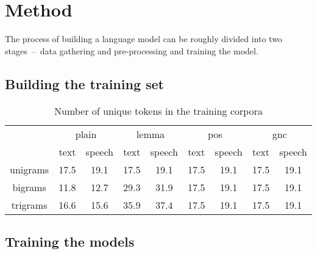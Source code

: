 \section{Method}
The process of building a language model can be roughly divided into two stages~--~data gathering and pre-processing and training the model.
\subsection{Building the training set}
\label{subsection:trainingset}

\begin{table}[!htbp]
	\centering
	\caption{Number of unique tokens in the training corpora}
	\begin{tabular}{*9c}
		{}        &  \multicolumn{2}{c}{plain} & \multicolumn{2}{c}{lemma} & \multicolumn{2}{c}{pos}& \multicolumn{2}{c}{gnc}\\
		\cmidrule{2-9}
		{}        &  text & speech & text & speech & text & speech & text & speech\\
		unigrams  &  17.5 & 19.1   & 17.5 & 19.1   & 17.5 & 19.1   & 17.5 & 19.1 \\
	        bigrams   &  11.8 & 12.7   & 29.3 & 31.9   & 17.5 & 19.1   & 17.5 & 19.1 \\
                trigrams  &  16.6 & 15.6   & 35.9 & 37.4   & 17.5 & 19.1   & 17.5 & 19.1 \\
	\end{tabular}
\end{table}

\subsection{Training the models}
